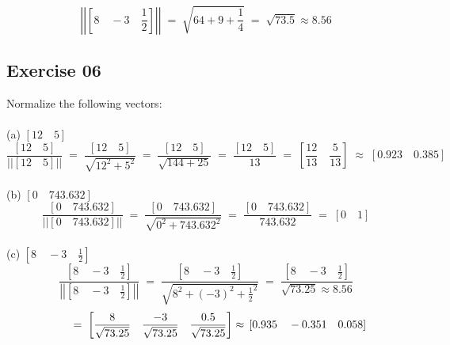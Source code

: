\documentclass[12pt, a4paper]{article}
\begin{document}
\begin{equation}
	\tag*{}
	\left|\left| \left[ 8 \quad -3 \quad \frac{1}{2} \right]
	\right|\right| \; = \; \sqrt{64 + 9 + \frac{1}{4}} \; = \; \sqrt{73.5}
	\approx 8.56
\end{equation}

\subsection*{Exercise 06}
Normalize the following vectors:\\\\
(a) \quad $\left[12 \quad 5 \right]$\\

\begin{equation}
	\tag*{}	
	\frac
	{
		\left[12 \quad 5\right]
	}
	{
		\left|\left|\left[12 \quad 5\right]\right|\right|
	} \; = \;	
	\frac
	{
		\left[12 \quad 5\right]
	}
	{
		\sqrt{12^2 + 5^2}	
	} \; = \;
	\frac
	{
		\left[12 \quad 5\right]
	}
	{
		\sqrt{144 + 25}
	} \; = \;
	\frac
	{
		\left[12 \quad 5\right]
	}
	{
		13
	} \; = \;
	\left[
		\frac
		{
			12			
		}
		{
			13
		}
		\quad
		\frac
		{
			5		
		}
		{
			13
		}
	\right] \; \approx \;
	\left[0.923 \quad 0.385 \right]
\end{equation}\\
(b) \quad $\left[0 \quad 743.632 \right]$\\
\begin{equation}
	\tag*{}
	\frac
	{
		\left[0 \quad 743.632\right]
	}
	{
		\left|\left|\left[0 \quad 743.632\right]\right|\right|
	} \; = \;
	\frac
	{
		\left[0 \quad 743.632\right]
	}
	{
		\sqrt{0^2 + 743.632^2}
	} \; = \;
	\frac
	{
		\left[0 \quad 743.632\right]
	}
	{
		743.632
	} \; = \;
	\left[
		0 \quad 1	
	\right]
\end{equation}\\
(c) \quad $\left[8 \quad -3 \quad \frac{1}{2} \right]$\\
\begin{equation}
	\tag*{}
	\frac
	{
		\left[8 \quad -3 \quad \frac{1}{2}\right]
	}
	{
		\left|\left|\left[
		8 \quad -3 \quad \frac{1}{2}
		\right]\right|\right|
	} \; = \;
	\frac
	{
		\left[8 \quad -3 \quad \frac{1}{2}\right]
	}
	{
		\sqrt{8^2 + (-3)^2 + \frac{1}{2}^2}
	} \; = \;
	\frac
	{
		\left[8 \quad -3 \quad \frac{1}{2}\right]
	}
	{
		\sqrt{73.25} \approx 8.56
	}
\end{equation}
\begin{equation}
	\tag*{}
	\; = \;	
	\left[
		\frac{8}{\sqrt{73.25}}\quad
		\frac{-3}{\sqrt{73.25}}\quad
		\frac{0.5}{\sqrt{73.25}}
	\right]
	\approx\\
	\left[
		0.935 \quad -0.351 \quad 0.058
	\right]
\end{equation}
\newpage\quad
\end{document}
